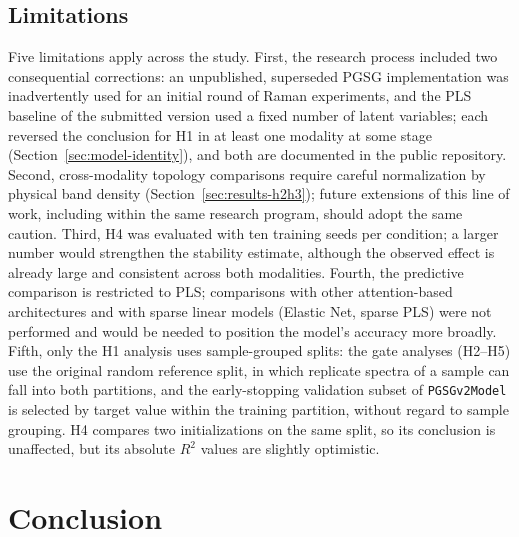 \documentclass[preprint,12pt]{elsarticle}
\begin{document}
\subsection{Limitations}

Five limitations apply across the study. First, the research process included two consequential corrections: an unpublished, superseded PGSG implementation was inadvertently used for an initial round of Raman experiments, and the PLS baseline of the submitted version used a fixed number of latent variables; each reversed the conclusion for H1 in at least one modality at some stage (Section~\ref{sec:model-identity}), and both are documented in the public repository. Second, cross-modality topology comparisons require careful normalization by physical band density (Section~\ref{sec:results-h2h3}); future extensions of this line of work, including within the same research program, should adopt the same caution. Third, H4 was evaluated with ten training seeds per condition; a larger number would strengthen the stability estimate, although the observed effect is already large and consistent across both modalities. Fourth, the predictive comparison is restricted to PLS; comparisons with other attention-based architectures and with sparse linear models (Elastic Net, sparse PLS) were not performed and would be needed to position the model's accuracy more broadly. Fifth, only the H1 analysis uses sample-grouped splits: the gate analyses (H2--H5) use the original random reference split, in which replicate spectra of a sample can fall into both partitions, and the early-stopping validation subset of \texttt{PGSGv2Model} is selected by target value within the training partition, without regard to sample grouping. H4 compares two initializations on the same split, so its conclusion is unaffected, but its absolute $R^{2}$ values are slightly optimistic.

\section{Conclusion}
\end{document}
